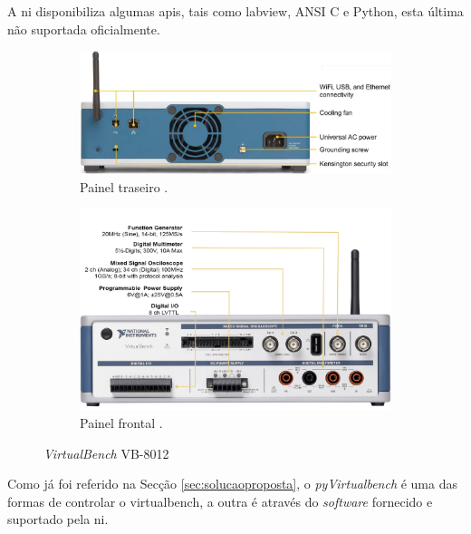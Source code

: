 A \acrshort{ni} disponibiliza algumas \acrshort{api}s, tais como \acrshort{labview}, ANSI C e Python, esta última não suportada oficialmente.

\begin{figure}
    \centering
    \begin{subfigure}[b]{1\textwidth}
        \centering
        \includegraphics[width=\textwidth]{figures/virtualbench_back-panel.jpg}
        \caption{Painel traseiro  \cite{datasheetVirtualBench}.}
        \label{fig:paineltraseiro}
    \end{subfigure}
    \hfill
    \begin{subfigure}[b]{1\textwidth}
        \centering
        \includegraphics[width=\textwidth]{figures/virtualbench_front-panel.jpg}
        \caption{Painel frontal  \cite{datasheetVirtualBench}.}
        \label{fig:paineldianteiro}
    \end{subfigure}
    \hfill
    \caption{\textit{VirtualBench} VB-8012}
    \label{fig:VB8012}
\end{figure}

Como já foi referido na Secção \ref{sec:solucaoproposta}, o \textit{pyVirtualbench} é uma das formas de controlar o \acrshort{virtualbench}, a outra é através do \textit{software} fornecido e suportado pela \acrshort{ni}.

